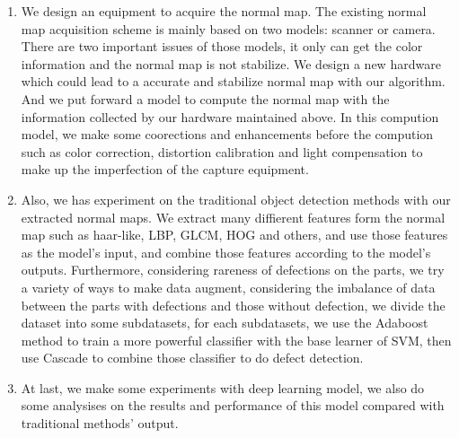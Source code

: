 \begin{englishabstract}
\begin{enumerate}
\item We design an equipment to acquire the normal map. The existing normal map acquisition scheme is mainly based on two models: scanner or camera. There are two important issues of those models, it only can get the color information and the normal map is not stabilize. We design a new hardware which could lead to a accurate and stabilize normal map with our algorithm. And we put forward a model to compute the normal map with the information collected by our hardware maintained above. In this compution model, we make some coorections and enhancements before the compution such as color correction, distortion calibration and light compensation to make up the imperfection of the capture equipment.
\item Also, we has experiment on the traditional object detection methods with our extracted normal maps. We extract many diffierent features form the normal map such as haar-like, LBP, GLCM, HOG and others, 
and use those features as the model's input, and combine those features according to the model's outputs. 
Furthermore, considering rareness of defections on the parts,
we try a variety of ways to make data augment, considering the imbalance of data between the parts with defections and those without defection, we divide the dataset into some  subdatasets, for each subdatasets, we use the Adaboost method to train a more powerful classifier with the base learner of SVM, then use Cascade to combine those classifier to do defect detection.
\item At last, we make some experiments with deep learning model, we also do some analysises on the results and performance of this model compared with traditional methods' output.
\end{enumerate}






\end{englishabstract}
